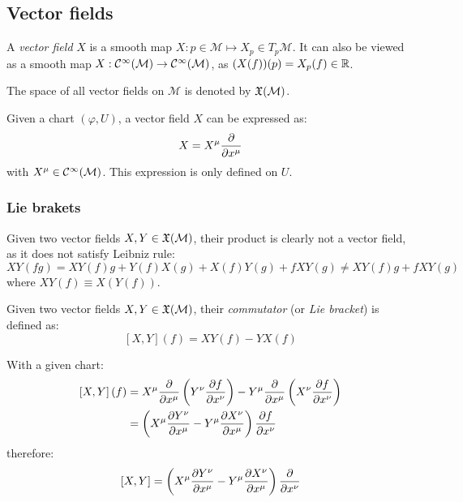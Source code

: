 \subsection{Vector fields}

\begin{definition}
  A \textit{vector field} $ X $ is a smooth map $ X : p \in \mathcal{M} \mapsto X_p \in T_p\mathcal{M} $. It can also be viewed as a smooth map $ X : \mathcal{C}^{\infty}(\mathcal{M}) \rightarrow \mathcal{C}^{\infty}(\mathcal{M}) $, as $ (X(f))(p) = X_p(f) \in \mathbb{R} $.
\end{definition}

\begin{definition}
  The space of all vector fields on $ \mathcal{M} $ is denoted by $ \mathfrak{X}(\mathcal{M}) $.
\end{definition}

Given a chart $ (\varphi,U) $, a vector field $ X $ can be expressed as:
\begin{equation}
  X = X^{\mu} \frac{\partial}{\partial x^{\mu}}
  \label{eq:2.6}
\end{equation}
with $ X^{\mu} \in \mathcal{C}^{\infty}(\mathcal{M}) $. This expression is only defined on $ U $.

\subsubsection{Lie brakets}

Given two vector fields $ X,Y \in\mathfrak{X}(\mathcal{M}) $, their product is clearly not a vector field, as it does not satisfy Leibniz rule:
\begin{equation*}
  XY(fg) = XY(f) g + Y(f) X(g) + X(f) Y(g) + f XY(g) \neq XY(f) g + f XY(g)
\end{equation*}
where $ XY(f) \equiv X(Y(f)) $.

\begin{definition}
  Given two vector fields $ X,Y \in\mathfrak{X}(\mathcal{M}) $, their \textit{commutator} (or \textit{Lie bracket}) is defined as:
  \begin{equation}
    \left[ X,Y \right](f) = XY(f) - YX(f)
    \label{eq:2.7}
  \end{equation}
\end{definition}

With a given chart:
\begin{equation*}
  \begin{split}
    \left[ X,Y \right](f)
    &= X^{\mu} \frac{\partial}{\partial x^{\mu}} \left( Y^{\nu} \frac{\partial f}{\partial x^{\nu}} \right) - Y^{\mu} \frac{\partial}{\partial x^{\mu}} \left( X^{\nu} \frac{\partial f}{\partial x^{\nu}} \right)\\
    &= \left( X^{\mu} \frac{\partial Y^{\nu}}{\partial x^{\mu}} - Y^{\mu} \frac{\partial X^{\nu}}{\partial x^{\mu}} \right) \frac{\partial f}{\partial x^{\nu}}
  \end{split}
\end{equation*}
therefore:
\begin{equation}
  \left[ X,Y \right] = \left( X^{\mu} \frac{\partial Y^{\nu}}{\partial x^{\mu}} - Y^{\mu} \frac{\partial X^{\nu}}{\partial x^{\mu}} \right) \frac{\partial}{\partial x^{\nu}}
  \label{eq:2.8}
\end{equation}

